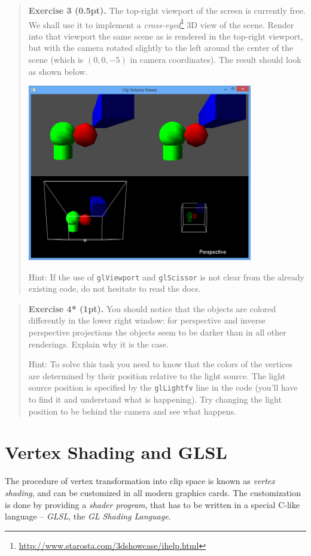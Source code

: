 \documentclass{article}
\newenvironment{exercise}[2]{\begin{verse}\textbf{Exercise #1 (#2pt).} }{
\end{verse}\medskip}
\begin{document}
\newpage
\begin{exercise}{3}{0.5}
The top-right viewport of the screen is currently free. We shall use it to implement a \emph{cross-eyed}\footnote{\url{http://www.starosta.com/3dshowcase/ihelp.html}} 3D view of the scene. Render into that viewport the same scene as is rendered in the top-right viewport, but with the camera rotated slightly to the left around the center of the scene (which is $(0, 0, -5)$ in camera coordinates). The result should look as shown below.
\begin{center}
\includegraphics[width=0.8\textwidth]{crosseye.png}
\end{center}

Hint: If the use of \texttt{glViewport} and \texttt{glScissor} is not clear from the already existing code, do not hesitate to read the docs.
\end{exercise}

\begin{exercise}{4*}{1}
You should notice that the objects are colored differently in the lower right window: for perspective and inverse perspective projections the objects seem to be darker than in all other renderings. Explain why it is the case.

Hint: To solve this task you need to know that the colors of the vertices are determined by their position relative to the light source. The light source position is specified by the \texttt{glLightfv} line in the code (you'll have to find it and understand what is happening). Try changing the light position to be behind the camera and see what happens.
\end{exercise}

\section{Vertex Shading and GLSL}
The procedure of vertex transformation into clip space is known as \emph{vertex shading}, and can be customized in all modern graphics cards. The customization is done by providing a \emph{shader program}, that has to be written in a special C-like language -- \emph{GLSL}, the \emph{GL Shading Language}.
\end{document}
